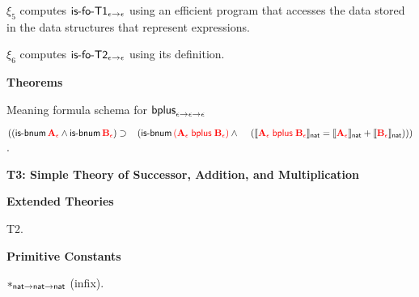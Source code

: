 \documentclass[fleqn,11pt]{article}
\begin{document}
    \item $\xi_5$ computes $\mbox{\sf is-fo-T1}_{\epsilon \rightarrow
      \epsilon}$ using an efficient program that accesses the data
      stored in the data structures that represent expressions.

    \item $\xi_6$ computes $\mbox{\sf is-fo-T2}_{\epsilon \rightarrow
      \epsilon}$ using its definition.

  \ee
    
  \item[] \textbf{Theorems}

    \be

      \setcounter{enumi}{0}

      \item Meaning formula schema for 
      $\mbox{\sf bplus}_{\epsilon \rightarrow \epsilon \rightarrow \epsilon}$

      $((\mbox{\sf is-bnum} \, \textcolor{red}{\textbf{A}_\epsilon} \wedge 
      \mbox{\sf is-bnum} \, \textcolor{red}{\textbf{B}_\epsilon}) 
      \supset {}\\
      \hspace*{2ex}(\mbox{\sf is-bnum} \, 
      \textcolor{red}{(\textbf{A}_\epsilon \; \mbox{\sf bplus} \; \textbf{B}_\epsilon)} \wedge {}\\
      \hspace*{2.8ex}(\llbracket\textcolor{red}{\textbf{A}_\epsilon \; \mbox{\sf bplus} \; 
      \textbf{B}_\epsilon}\rrbracket_{\sf nat} = 
      \llbracket\textcolor{red}{\textbf{A}_\epsilon}\rrbracket_{\sf nat} + 
      \llbracket\textcolor{red}{\textbf{B}_\epsilon}\rrbracket_{\sf nat})))$.

    \ee

\ei

\noindent
\textbf{T3: Simple Theory of Successor, Addition, and Multiplication}

\bi

  \item[] \textbf{Extended Theories} 

  \be

    \setcounter{enumi}{1}

    \item T2.

  \ee

  \item[] \textbf{Primitive Constants}

  \be

    \setcounter{enumi}{4}

    \item $*_{{\sf nat} \rightarrow {\sf nat} \rightarrow {\sf nat}}$ (infix).
\end{document}
